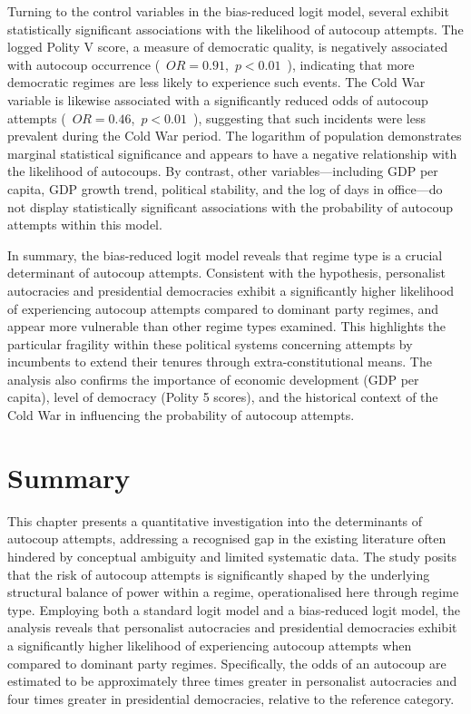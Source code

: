 \documentclass[
  12pt,
]{report}
\begin{document}
Turning to the control variables in the bias-reduced logit model,
several exhibit statistically significant associations with the
likelihood of autocoup attempts. The logged Polity V score, a measure of
democratic quality, is negatively associated with autocoup occurrence
(\, \(OR = 0.91\),\, \(p<0.01\) \,), indicating that more democratic
regimes are less likely to experience such events. The Cold War variable
is likewise associated with a significantly reduced odds of autocoup
attempts (\, \(OR = 0.46\), \,\(p<0.01\) \,), suggesting that such
incidents were less prevalent during the Cold War period. The logarithm
of population demonstrates marginal statistical significance and appears
to have a negative relationship with the likelihood of autocoups. By
contrast, other variables---including GDP per capita, GDP growth trend,
political stability, and the log of days in office---do not display
statistically significant associations with the probability of autocoup
attempts within this model.

In summary, the bias-reduced logit model reveals that regime type is a
crucial determinant of autocoup attempts. Consistent with the
hypothesis, personalist autocracies and presidential democracies exhibit
a significantly higher likelihood of experiencing autocoup attempts
compared to dominant party regimes, and appear more vulnerable than
other regime types examined. This highlights the particular fragility
within these political systems concerning attempts by incumbents to
extend their tenures through extra-constitutional means. The analysis
also confirms the importance of economic development (GDP per capita),
level of democracy (Polity 5 scores), and the historical context of the
Cold War in influencing the probability of autocoup attempts.

\section{Summary}\label{summary-1}

This chapter presents a quantitative investigation into the determinants
of autocoup attempts, addressing a recognised gap in the existing
literature often hindered by conceptual ambiguity and limited systematic
data. The study posits that the risk of autocoup attempts is
significantly shaped by the underlying structural balance of power
within a regime, operationalised here through regime type. Employing
both a standard logit model and a bias-reduced logit model, the analysis
reveals that personalist autocracies and presidential democracies
exhibit a significantly higher likelihood of experiencing autocoup
attempts when compared to dominant party regimes. Specifically, the odds
of an autocoup are estimated to be approximately three times greater in
personalist autocracies and four times greater in presidential
democracies, relative to the reference category.
\end{document}
